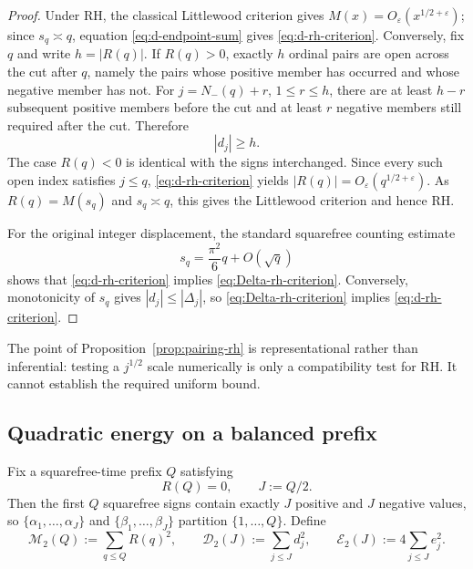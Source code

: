 \documentclass[11pt]{amsart}
\numberwithin{equation}{section}
\theoremstyle{plain}
\theoremstyle{definition}
\theoremstyle{remark}
\begin{document}
\begin{proof}
Under RH, the classical Littlewood criterion gives
$M(x)=O_\varepsilon(x^{1/2+\varepsilon})$; since $s_q\asymp q$, equation
\eqref{eq:d-endpoint-sum} gives \eqref{eq:d-rh-criterion}.
Conversely, fix $q$ and write $h=|R(q)|$.  If $R(q)>0$, exactly $h$ ordinal
pairs are open across the cut after $q$, namely the pairs whose positive member
has occurred and whose negative member has not.  For
$j=N_-(q)+r$, $1\le r\le h$, there are at least $h-r$ subsequent positive
members before the cut and at least $r$ negative members still required after
the cut.  Therefore
\begin{equation}
\label{eq:open-pair-lower-bound}
|d_j|\ge h.
\end{equation}
The case $R(q)<0$ is identical with the signs interchanged.  Since every such
open index satisfies $j\le q$, \eqref{eq:d-rh-criterion} yields
$|R(q)|=O_\varepsilon(q^{1/2+\varepsilon})$.  As $R(q)=M(s_q)$ and $s_q\asymp q$,
this gives the Littlewood criterion and hence RH.

For the original integer displacement, the standard squarefree counting
estimate \cite{Apostol1976}
\begin{equation}
\label{eq:squarefree-inverse}
s_q=\frac{\pi^2}{6}q+O(\sqrt q)
\end{equation}
shows that \eqref{eq:d-rh-criterion} implies
\eqref{eq:Delta-rh-criterion}.  Conversely, monotonicity of $s_q$ gives
$|d_j|\le|\Delta_j|$, so \eqref{eq:Delta-rh-criterion} implies
\eqref{eq:d-rh-criterion}.
\end{proof}

The point of Proposition~\ref{prop:pairing-rh} is representational rather than
inferential: testing a $j^{1/2}$ scale numerically is only a compatibility test
for RH.  It cannot establish the required uniform bound.

\subsection{Quadratic energy on a balanced prefix}
\label{subsec:quadratic-energy}

Fix a squarefree-time prefix $Q$ satisfying
\begin{equation}
\label{eq:balanced-prefix}
R(Q)=0,
\qquad
J:=Q/2.
\end{equation}
Then the first $Q$ squarefree signs contain exactly $J$ positive and $J$
negative values, so $\{\alpha_1,\ldots,\alpha_J\}$ and
$\{\beta_1,\ldots,\beta_J\}$ partition $\{1,\ldots,Q\}$.  Define
\begin{equation}
\label{eq:quadratic-energies}
\mathcal M_2(Q):=\sum_{q\le Q}R(q)^2,
\qquad
\mathcal D_2(J):=\sum_{j\le J}d_j^2,
\qquad
\mathcal E_2(J):=4\sum_{j\le J}e_j^2.
\end{equation}
\end{document}
